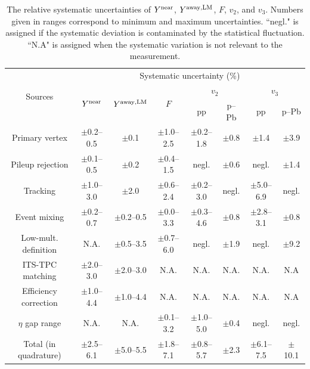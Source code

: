\begin{table}[h!]
\caption{The relative systematic uncertainties of $Y^{\rm{near}}$, $Y^{\rm{away,LM}}$, $F$, $v_{2}$, and $v_{3}$. Numbers given in ranges correspond to minimum and maximum uncertainties. ``negl." is assigned if the systematic deviation is contaminated by the statistical fluctuation. ``N.A" is assigned when the systematic variation is not relevant to the measurement. }
\centering
\label{tab:syst}
\resizebox{\textwidth}{!} {
\begin{tabular}{c|ccccccc}
\hline 
\multirow{3}{*}{Sources}  & \multicolumn{7}{c}{Systematic uncertainty (\%)} \\ \cline{2-8} 
& \multirow{2}{*}{$Y^{\rm{near}}$} & \multirow{2}{*}{$Y^{\rm{away,LM}}$} & \multirow{2}{*}{$F$} & \multicolumn{2}{c}{$v_{2}$} & \multicolumn{2}{c}{$v_{3}$}  \\   \cline{5-8}
& & & & pp & p--Pb & pp & p--Pb  \\ \cline{1-8} 
Primary vertex       & $\pm$0.2--0.5 & $\pm$0.1      & $\pm$1.0--2.5 & $\pm$0.2--1.8 & $\pm$0.8 & $\pm$1.4 & $\pm$3.9 \\ 
Pileup rejection     & $\pm$0.1--0.5 & $\pm$0.2      & $\pm$0.4--1.5 & negl.         & $\pm$0.6 & negl. & $\pm$1.4 \\ 
Tracking		     & $\pm$1.0--3.0 & $\pm$2.0      & $\pm$0.6--2.4 & $\pm$0.2--3.0 & negl. & $\pm$5.0--6.9 & negl. \\ 
Event mixing	     & $\pm$0.2--0.7 & $\pm$0.2--0.5 & $\pm$0.0--3.3 & $\pm$0.3--4.6 & $\pm$0.8 & $\pm$2.8--3.1 & $\pm$0.8 \\ 
Low-mult. definition & N.A.          & $\pm$0.5--3.5 & $\pm$0.7--6.0 & negl.         & $\pm$1.9 & negl. & $\pm$9.2\\ 
ITS-TPC matching 	 & $\pm$2.0--3.0 & $\pm$2.0--3.0 & N.A.          & N.A.          & N.A. & N.A. & N.A\\ 
Efficiency correction& $\pm$1.0--4.4 & $\pm$1.0--4.4 & N.A.          & N.A.          & N.A. & N.A. & N.A\\ 
$\eta$ gap range   	 & N.A.          & N.A.          & $\pm$0.1--3.2 & $\pm$1.0--5.0 & $\pm$0.4 & negl. & negl. \\ 

\hline 
Total (in quadrature)& $\pm$2.5--6.1 & $\pm$5.0--5.5 & $\pm$1.8--7.1 & $\pm$0.8--5.7 & $\pm$2.3 & $\pm$6.1--7.5 & $\pm$10.1 \\ 
\hline 
\end{tabular}
}
\end{table}

